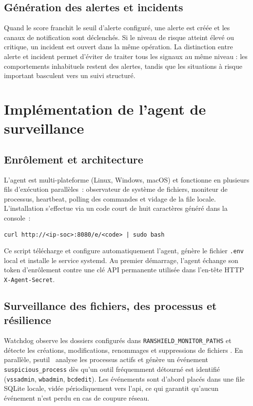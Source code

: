 \subsection{Génération des alertes et incidents}

Quand le score franchit le seuil d'alerte configuré, une \gls{alerte} est créée et les canaux de notification sont déclenchés. Si le niveau de risque atteint élevé ou critique, un \gls{incident} est ouvert dans la même opération. La distinction entre alerte et incident permet d'éviter de traiter tous les signaux au même niveau : les comportements inhabituels restent des alertes, tandis que les situations à risque important basculent vers un suivi structuré.

\section{Implémentation de l'agent de surveillance}

\subsection{Enrôlement et architecture}

L'\gls{agent} est multi-plateforme (Linux, Windows, macOS) et fonctionne en plusieurs fils d'exécution parallèles~: observateur de système de fichiers, moniteur de processus, heartbeat, polling des commandes et vidage de la file locale. L'installation s'effectue via un code court de huit caractères généré dans la console~:

\begin{verbatim}
curl http://<ip-soc>:8080/e/<code> | sudo bash
\end{verbatim}

\noindent Ce script télécharge et configure automatiquement l'agent, génère le fichier \texttt{.env} local et installe le service systemd. Au premier démarrage, l'agent échange son token d'enrôlement contre une clé API permanente utilisée dans l'en-tête HTTP \texttt{X-Agent-Secret}.

\subsection{Surveillance des fichiers, des processus et résilience}

Watchdog observe les dossiers configurés dans \texttt{RANSHIELD\_MONITOR\_PATHS} et détecte les créations, modifications, renommages et suppressions de fichiers \cite{watchdogDocs}. En parallèle, psutil~\cite{psutilDocs} analyse les processus actifs et génère un événement \texttt{suspicious\_process} dès qu'un outil fréquemment détourné est identifié (\texttt{vssadmin}, \texttt{wbadmin}, \texttt{bcdedit}). Les événements sont d'abord placés dans une file SQLite locale, vidée périodiquement vers l'\gls{api}, ce qui garantit qu'aucun événement n'est perdu en cas de coupure réseau.

